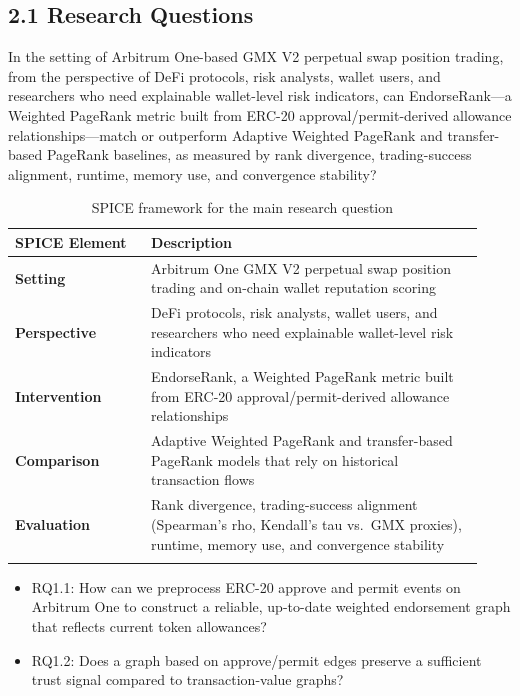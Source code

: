 \subsection*{2.1 Research Questions}
\label{sec:research-questions}

In the setting of Arbitrum One-based GMX V2 perpetual swap position trading, from the perspective of DeFi protocols, risk analysts, wallet users, and researchers who need explainable wallet-level risk indicators, can EndorseRank---a Weighted PageRank metric built from ERC-20 approval/permit-derived allowance relationships---match or outperform Adaptive Weighted PageRank and transfer-based PageRank baselines, as measured by rank divergence, trading-success alignment, runtime, memory use, and convergence stability?


\begin{longtable}{>{\raggedright\arraybackslash}p{0.27\linewidth}>{\raggedright\arraybackslash}p{0.66\linewidth}}
\caption{SPICE framework for the main research question}\\
\toprule
\textbf{SPICE Element} & Description \\
\midrule
\textbf{Setting} & Arbitrum One GMX V2 perpetual swap position trading and on-chain wallet reputation scoring \\
\addlinespace
\textbf{Perspective} & DeFi protocols, risk analysts, wallet users, and researchers who need explainable wallet-level risk indicators \\
\addlinespace
\textbf{Intervention} & EndorseRank, a Weighted PageRank metric built from ERC-20 approval/permit-derived allowance relationships \\
\addlinespace
\textbf{Comparison} & Adaptive Weighted PageRank and transfer-based PageRank models that rely on historical transaction flows \\
\addlinespace
\textbf{Evaluation} & Rank divergence, trading-success alignment (Spearman's rho, Kendall's tau vs.\ GMX proxies), runtime, memory use, and convergence stability \\
\addlinespace
\bottomrule
\end{longtable}


\begin{itemize}
\item[\textendash] RQ1.1: How can we preprocess ERC-20 approve and permit events on Arbitrum One to construct a reliable, up-to-date weighted endorsement graph that reflects current token allowances?
\item[\textendash] RQ1.2: Does a graph based on approve/permit edges preserve a sufficient trust signal compared to transaction-value graphs?
\end{itemize}

